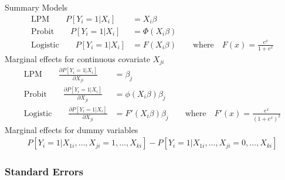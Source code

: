 \documentclass[aspectratio=169, handout]{beamer}
\begin{document}
\begin{frame}[shrink]{Summary}
Models
\begin{align*}
  \text{LPM}
  \qquad
  P[Y_i=1|X_i] &= X_i\beta \\
  \text{Probit}
  \qquad
  P[Y_i=1|X_i] &= \Phi(X_i\beta) \\
  \text{Logistic}
  \qquad
  P[Y_i=1|X_i] &= F(X_i\beta)
  \qquad\text{where}\quad
  F(x) = \frac{e^x}{1+e^x}
\end{align*}
Marginal effects for continuous covariate $X_{ji}$
\begin{align*}
  \text{LPM}
  \qquad
  \frac{\partial P[Y_i=1|X_i]}{\partial X_{ji}}
  &= \beta_j
  \\
  \text{Probit}
  \qquad
  \frac{\partial P[Y_i=1|X_i]}{\partial X_{ji}}
  &= \phi(X_i\beta)\beta_j
  \\
  \text{Logistic}
  \qquad
  \frac{\partial P[Y_i=1|X_i]}{\partial X_{ji}}
  &= F'(X_i\beta)\beta_j
  \qquad\text{where}\quad
  F'(x) = \frac{e^x}{(1+e^x)^2}
\end{align*}
Marginal effects for dummy variables
\begin{align*}
  P[Y_i=1|X_{1i},\ldots,X_{ji}=1,\ldots,X_{ki}]
  -P[Y_i=1|X_{1i},\ldots,X_{ji}=0,\ldots,X_{ki}]
\end{align*}
\end{frame}


\subsubsection{Standard Errors}
\end{document}
